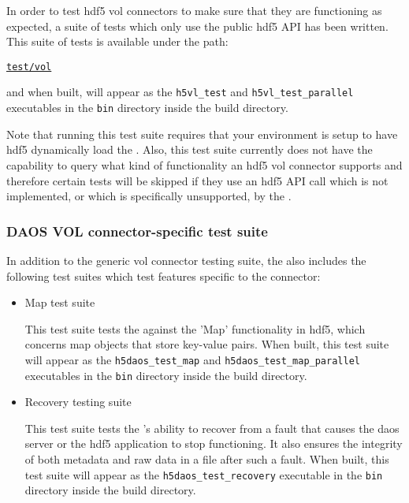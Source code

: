 \documentclass[../users_guide.tex]{subfiles}
\begin{document}
In order to test \acrshort{hdf5} \acrshort{vol} \glspl{connector} to make sure that they are functioning as expected, a suite of tests which only use the public \acrshort{hdf5} API has been written. This suite of tests is available under the path:

\href{https://bitbucket.hdfgroup.org/projects/HDF5VOL/repos/daos-vol/browse/test}{\texttt{test/vol}}

and when built, will appear as the \texttt{h5vl\_test} and \texttt{h5vl\_test\_parallel} executables in the \texttt{bin} directory inside the build directory.

Note that running this test suite requires that your environment is setup to have \acrshort{hdf5} dynamically load the \dvc{}. Also, this test suite currently does not have the capability to query what kind of functionality an \acrshort{hdf5} \acrshort{vol} \gls{connector} supports and therefore certain tests will be skipped if they use an \acrshort{hdf5} API call which is not implemented, or which is specifically unsupported, by the \dvc.

\subsubsection{DAOS VOL connector-specific test suite}

In addition to the generic \acrshort{vol} \gls{connector} testing suite, the \dvc{} also includes the following test suites which test features specific to the \gls{connector}:

\begin{itemize}
    \item \dvc{} Map test suite

    This test suite tests the \dvc{} against the 'Map' functionality in \acrshort{hdf5}, which concerns map objects that store key-value pairs. When built, this test suite will appear as the \texttt{h5daos\_test\_map} and \texttt{h5daos\_test\_map\_parallel} executables in the \texttt{bin} directory inside the build directory.

    \item \dvc{} Recovery testing suite

    This test suite tests the \dvc's ability to recover from a fault that causes the \acrshort{daos} server or the \acrshort{hdf5} application to stop functioning. It also ensures the integrity of both metadata and raw data in a file after such a fault. When built, this test suite will appear as the \texttt{h5daos\_test\_recovery} executable in the \texttt{bin} directory inside the build directory.
\end{itemize}
\end{document}

